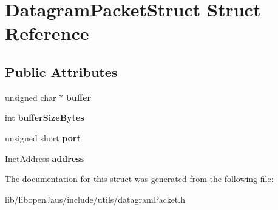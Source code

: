 \hypertarget{struct_datagram_packet_struct}{\section{\-Datagram\-Packet\-Struct \-Struct \-Reference}
\label{struct_datagram_packet_struct}
}
\subsection*{\-Public \-Attributes}
\begin{DoxyCompactItemize}
\item 
\hypertarget{struct_datagram_packet_struct_a52328b37423034fd23adbac127db3aa4}{unsigned char $\ast$ {\bfseries buffer}}\label{struct_datagram_packet_struct_a52328b37423034fd23adbac127db3aa4}

\item 
\hypertarget{struct_datagram_packet_struct_ac1e3649a82ef083e98e434f6140e8cc8}{int {\bfseries buffer\-Size\-Bytes}}\label{struct_datagram_packet_struct_ac1e3649a82ef083e98e434f6140e8cc8}

\item 
\hypertarget{struct_datagram_packet_struct_ab987a37324a8557de14738819d643e64}{unsigned short {\bfseries port}}\label{struct_datagram_packet_struct_ab987a37324a8557de14738819d643e64}

\item 
\hypertarget{struct_datagram_packet_struct_a6e3e9e3873a44d9ba914a8eb6619d340}{\hyperlink{struct_inet_address_struct}{\-Inet\-Address} {\bfseries address}}\label{struct_datagram_packet_struct_a6e3e9e3873a44d9ba914a8eb6619d340}

\end{DoxyCompactItemize}


\-The documentation for this struct was generated from the following file\-:\begin{DoxyCompactItemize}
\item 
lib/libopen\-Jaus/include/utils/datagram\-Packet.\-h\end{DoxyCompactItemize}
